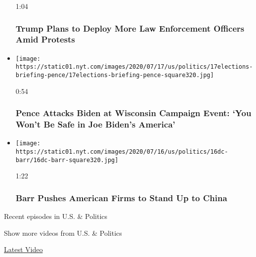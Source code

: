 \begin{itemize}
  1:04

  \hypertarget{trump-plans-to-deploy-more-law-enforcement-officers-amid-protests}{%
  \subsubsection{Trump Plans to Deploy More Law Enforcement Officers
  Amid
  Protests}\label{trump-plans-to-deploy-more-law-enforcement-officers-amid-protests}}
\item
  \href{https://www.nytimes.com/video/us/100000007244976/pence-calls-out-biden-wisconsin.html?action=click\&module=video-series-bar\&region=header\&pgtype=Article\&playlistId=video/us-politics}{}

  \texttt{[image: https://static01.nyt.com/images/2020/07/17/us/politics/17elections-briefing-pence/17elections-briefing-pence-square320.jpg]}

  0:54

  \hypertarget{pence-attacks-biden-at-wisconsin-campaign-event-you-wont-be-safe-in-joe-bidens-america}{%
  \subsubsection{Pence Attacks Biden at Wisconsin Campaign Event: `You
  Won't Be Safe in Joe Biden's
  America'}\label{pence-attacks-biden-at-wisconsin-campaign-event-you-wont-be-safe-in-joe-bidens-america}}
\item
  \href{https://www.nytimes.com/video/us/elections/100000007242467/barr-china-companies-economy.html?action=click\&module=video-series-bar\&region=header\&pgtype=Article\&playlistId=video/us-politics}{}

  \texttt{[image: https://static01.nyt.com/images/2020/07/16/us/politics/16dc-barr/16dc-barr-square320.jpg]}

  1:22

  \hypertarget{barr-pushes-american-firms-to-stand-up-to-china}{%
  \subsubsection{Barr Pushes American Firms to Stand Up to
  China}\label{barr-pushes-american-firms-to-stand-up-to-china}}
\end{itemize}

Recent episodes in U.S. \& Politics

Show more videos from U.S. \& Politics

\href{/video}{}

\href{/video/latest-video}{Latest Video}

